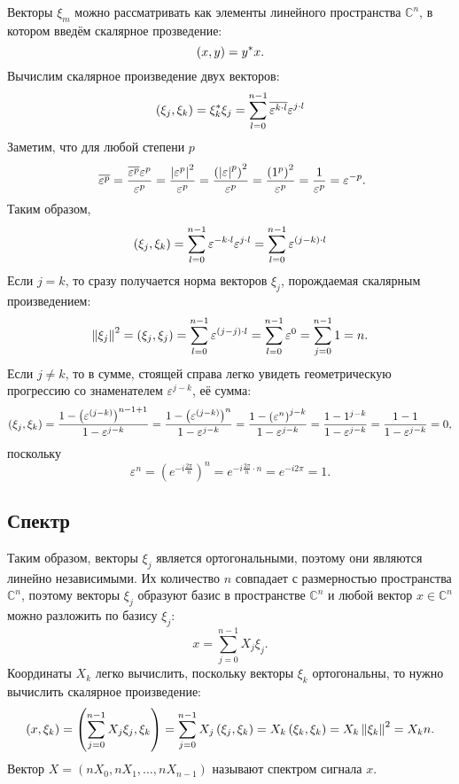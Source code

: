 Векторы $\xi_m$ можно рассматривать как элементы линейного пространства $\mathbb{C}^n$, в котором введём скалярное прозведение:
\[
    \left ( x, y \right ) = y^* x .
\]
Вычислим скалярное произведение двух векторов:
\[
    \left ( \xi_j, \xi_k \right )
    = \xi_k^* \xi_j
    = \sum_{l=0}^{n-1} \overline{\varepsilon^{k \cdot l}} \varepsilon^{j \cdot l}
\]
Заметим, что для любой степени $p$
\begin{equation}
    ~\label{linear:Fourier:conjugation}
    \overline{\varepsilon^{p}}
    = \frac{\overline{\varepsilon^{p}} \varepsilon^{p}}{\varepsilon^{p}}
    = \frac{\left | \varepsilon^{p} \right |^2}{\varepsilon^{p}}
    = \frac{\left ( \left | \varepsilon \right |^{p} \right )^2}{\varepsilon^{p}}
    = \frac{\left ( 1^{p} \right )^2}{\varepsilon^{p}}
    = \frac{1}{\varepsilon^{p}}
    = \varepsilon^{- p}
    .
\end{equation}
Таким образом,
\[
    \left ( \xi_j, \xi_k \right )
    = \sum_{l=0}^{n-1} \varepsilon^{- k \cdot l} \varepsilon^{j \cdot l}
    = \sum_{l=0}^{n-1} \varepsilon^{(j - k) \cdot l}
\]
Если $j = k$, то сразу получается норма векторов $\xi_j$, порождаемая скалярным произведением:
\[
    \left \| \xi_j \right \|^2
    = \left ( \xi_j, \xi_j \right )
    = \sum_{l=0}^{n-1} \varepsilon^{( j - j ) \cdot l}
    = \sum_{l=0}^{n-1} \varepsilon^0
    = \sum_{j=0}^{n-1} 1
    = n .
\]
Если $j \neq k$, то в сумме, стоящей справа легко увидеть геометрическую прогрессию со знаменателем $\varepsilon^{j - k}$, её сумма:
\[
    \left ( \xi_j, \xi_k \right )
    = \frac{1 - \left( \varepsilon^{(j-k)} \right)^{n-1+1}}{1 - \varepsilon^{j - k}}
    = \frac{1 - \left( \varepsilon^{(j-k)} \right)^n}{1 - \varepsilon^{j - k}}
    = \frac{1 - \left( \varepsilon^n \right)^{j-k}}{1 - \varepsilon^{j - k}}
    = \frac{1 - 1^{j-k}}{1 - \varepsilon^{j - k}}
    = \frac{1 - 1}{1 - \varepsilon^{j - k}}
    = 0 ,
\]
поскольку
\[
    \varepsilon^n
    = \left( e^{- i \frac{2 \pi}{n}} \right)^n
    = e^{- i \frac{2 \pi}{n} \cdot n}
    = e^{- i 2 \pi}
    = 1.
\]

\subsection{Спектр}

Таким образом, векторы $\xi_j$ является ортогональными, поэтому они являются линейно независимыми. Их количество $n$ совпадает с размерностью пространства $\mathbb{C}^n$,
поэтому векторы $\xi_j$ образуют базис в пространстве $\mathbb{C}^n$ и любой вектор $x \in \mathbb{C}^n$ можно разложить по базису $\xi_j$:
\[
    x = \sum_{j=0}^{n-1} X_j \xi_j.
\]
Координаты $X_k$ легко вычислить, поскольку векторы $\xi_k$ ортогональны, то нужно вычислить скалярное произведение:
\[
    \left ( x, \xi_k \right )
    = \left ( \sum_{j=0}^{n-1} X_j \xi_j, \xi_k \right )
    = \sum_{j=0}^{n-1} X_j \left ( \xi_j, \xi_k \right )
    = X_k \left ( \xi_k, \xi_k \right )
    = X_k \left \| \xi_k \right \|^2
    = X_k n
    .
\]
Вектор $X = \left ( n X_0, n X_1, \dots, n X_{n-1} \right )$ называют спектром сигнала $x$.

